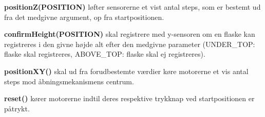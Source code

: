 \textbf{positionZ(POSITION)} løfter sensorerne et vist antal steps, som er bestemt ud fra det medgivne argument, op fra startpositionen.

\textbf{confirmHeight(POSITION)} skal registrere med y-sensoren om en flaske kan registreres i den givne højde alt efter den medgivne parameter (UNDER\_TOP: flaske skal registreres, ABOVE\_TOP: flaske skal ej registreres).

\textbf{positionXY()} skal ud fra forudbestemte værdier køre motorerne et vis antal steps mod åbningsmekanismens centrum.

\textbf{reset()} kører motorerne indtil deres respektive trykknap ved startpositionen er påtrykt.